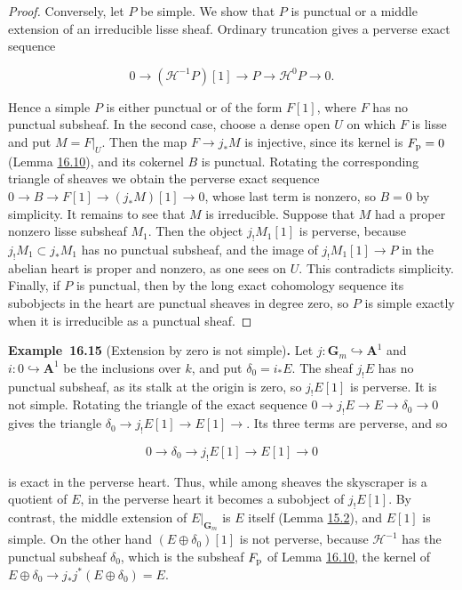 \documentclass[11pt]{article}
\newenvironment{bpstatement}[2]{\par\addvspace{0.6\baselineskip}\noindent\textbf{#1}#2\textbf{.}\enspace\ignorespaces}
  {\par\addvspace{0.4\baselineskip}}
\begin{document}
\begin{proof}[{Proof}]
Conversely, let \(P\) be simple. We show that \(P\) is punctual or a middle extension of an irreducible lisse sheaf. Ordinary truncation gives a perverse exact sequence

\[
0\longrightarrow(\mathcal H^{-1}P)[1]
\longrightarrow P\longrightarrow\mathcal H^0P\longrightarrow0.
\]

Hence a simple \(P\) is either punctual or of the form \(F[1]\), where \(F\) has no punctual subsheaf. In the second case, choose a dense open \(U\) on which \(F\) is lisse and put \(M=F|_U\). Then the map \(F\to j_*M\) is injective, since its kernel is \(F_{\rm p}=0\) (Lemma \hyperref[bp199]{16.10}), and its cokernel \(B\) is punctual. Rotating the corresponding triangle of sheaves we obtain the perverse exact sequence \(0\to B\to F[1]\to(j_*M)[1]\to0\), whose last term is nonzero, so \(B=0\) by simplicity. It remains to see that \(M\) is irreducible. Suppose that \(M\) had a proper nonzero lisse subsheaf \(M_1\). Then the object \(j_!M_1[1]\) is perverse, because \(j_!M_1\subset j_*M_1\) has no punctual subsheaf, and the image of \(j_!M_1[1]\to P\) in the abelian heart is proper and nonzero, as one sees on \(U\). This contradicts simplicity. Finally, if \(P\) is punctual, then by the long exact cohomology sequence its subobjects in the heart are punctual sheaves in degree zero, so \(P\) is simple exactly when it is irreducible as a punctual sheaf.
\end{proof}

\label{bp211}%
\begin{bpstatement}{Example~16.15}{ (Extension by zero is not simple)}
Let \(j:\mathbf G_m\hookrightarrow\mathbf A^1\) and \(i:0\hookrightarrow\mathbf A^1\) be the inclusions over \(k\), and put \(\delta_0=i_*E\). The sheaf \(j_!E\) has no punctual subsheaf, as its stalk at the origin is zero, so \(j_!E[1]\) is perverse. It is not simple. Rotating the triangle of the exact sequence \(0\to j_!E\to E\to\delta_0\to0\) gives the triangle \(\delta_0\to j_!E[1]\to E[1]\to\). Its three terms are perverse, and so

\[
0\longrightarrow\delta_0\longrightarrow j_!E[1]
\longrightarrow E[1]\longrightarrow0
\]

is exact in the perverse heart. Thus, while among sheaves the skyscraper is a quotient of \(E\), in the perverse heart it becomes a subobject of \(j_!E[1]\). By contrast, the middle extension of \(E|_{\mathbf G_m}\) is \(E\) itself (Lemma \hyperref[bp127]{15.2}), and \(E[1]\) is simple. On the other hand \((E\oplus\delta_0)[1]\) is not perverse, because \(\mathcal H^{-1}\) has the punctual subsheaf \(\delta_0\), which is the subsheaf \(F_{\rm p}\) of Lemma \hyperref[bp199]{16.10}, the kernel of \(E\oplus\delta_0\to j_*j^*(E\oplus\delta_0)=E\).
\end{bpstatement}
\end{document}
